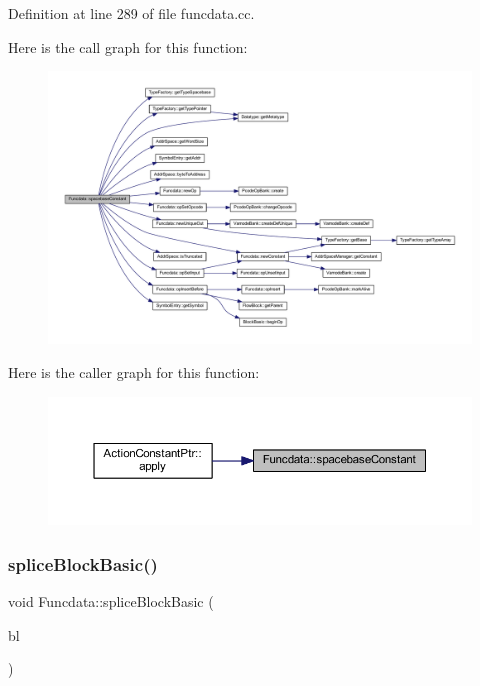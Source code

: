 Definition at line 289 of file funcdata.\+cc.

Here is the call graph for this function\+:
\nopagebreak
\begin{figure}[H]
\begin{center}
\leavevmode
\includegraphics[width=350pt]{class_funcdata_aaf4a89f4e3da37a4107992689f7b89ff_cgraph}
\end{center}
\end{figure}
Here is the caller graph for this function\+:
\nopagebreak
\begin{figure}[H]
\begin{center}
\leavevmode
\includegraphics[width=350pt]{class_funcdata_aaf4a89f4e3da37a4107992689f7b89ff_icgraph}
\end{center}
\end{figure}
\mbox{\label{class_funcdata_a9f0c9d7c7fb4217731ae45f7848e4034}} 
\subsubsection{\texorpdfstring{spliceBlockBasic()}{spliceBlockBasic()}}
{\footnotesize\ttfamily void Funcdata\+::splice\+Block\+Basic (\begin{DoxyParamCaption}\item[{\mbox{\hyperlink{class_block_basic}{Block\+Basic}} $\ast$}]{bl }\end{DoxyParamCaption})}



